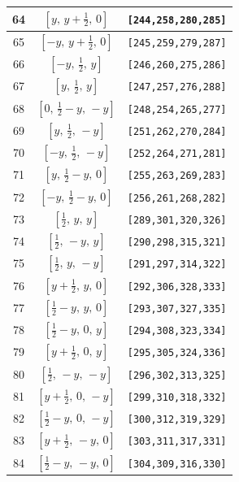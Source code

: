 \documentclass[fleqn,8pt]{jsarticle}
\begin{document}
\begin{longtable}{ccc}
64 & $\left[ y,\, y + \frac{1}{2},\, 0 \right]$ & {\tt [244,258,280,285]} \\ \hline
65 & $\left[ - y,\, y + \frac{1}{2},\, 0 \right]$ & {\tt [245,259,279,287]} \\ \hline
66 & $\left[ - y,\, \frac{1}{2},\, y \right]$ & {\tt [246,260,275,286]} \\ \hline
67 & $\left[ y,\, \frac{1}{2},\, y \right]$ & {\tt [247,257,276,288]} \\ \hline
68 & $\left[ 0,\, \frac{1}{2} - y,\, - y \right]$ & {\tt [248,254,265,277]} \\ \hline
69 & $\left[ y,\, \frac{1}{2},\, - y \right]$ & {\tt [251,262,270,284]} \\ \hline
70 & $\left[ - y,\, \frac{1}{2},\, - y \right]$ & {\tt [252,264,271,281]} \\ \hline
71 & $\left[ y,\, \frac{1}{2} - y,\, 0 \right]$ & {\tt [255,263,269,283]} \\ \hline
72 & $\left[ - y,\, \frac{1}{2} - y,\, 0 \right]$ & {\tt [256,261,268,282]} \\ \hline
73 & $\left[ \frac{1}{2},\, y,\, y \right]$ & {\tt [289,301,320,326]} \\ \hline
74 & $\left[ \frac{1}{2},\, - y,\, y \right]$ & {\tt [290,298,315,321]} \\ \hline
75 & $\left[ \frac{1}{2},\, y,\, - y \right]$ & {\tt [291,297,314,322]} \\ \hline
76 & $\left[ y + \frac{1}{2},\, y,\, 0 \right]$ & {\tt [292,306,328,333]} \\ \hline
77 & $\left[ \frac{1}{2} - y,\, y,\, 0 \right]$ & {\tt [293,307,327,335]} \\ \hline
78 & $\left[ \frac{1}{2} - y,\, 0,\, y \right]$ & {\tt [294,308,323,334]} \\ \hline
79 & $\left[ y + \frac{1}{2},\, 0,\, y \right]$ & {\tt [295,305,324,336]} \\ \hline
80 & $\left[ \frac{1}{2},\, - y,\, - y \right]$ & {\tt [296,302,313,325]} \\ \hline
81 & $\left[ y + \frac{1}{2},\, 0,\, - y \right]$ & {\tt [299,310,318,332]} \\ \hline
82 & $\left[ \frac{1}{2} - y,\, 0,\, - y \right]$ & {\tt [300,312,319,329]} \\ \hline
83 & $\left[ y + \frac{1}{2},\, - y,\, 0 \right]$ & {\tt [303,311,317,331]} \\ \hline
84 & $\left[ \frac{1}{2} - y,\, - y,\, 0 \right]$ & {\tt [304,309,316,330]} \\ \hline

\end{longtable}
\end{document}
